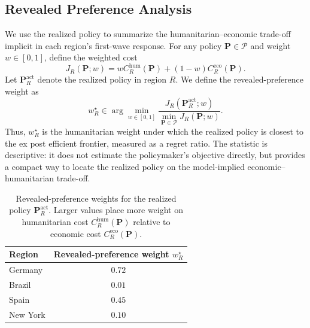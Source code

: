 \documentclass[msom,blindrev]{informs3} %
\newcommand{\rev}[1]{{\color{blue}#1}}
\begin{document}
\begin{APPENDICES}
\section{\rev{Revealed Preference Analysis}}
\label{app:revealed_preference}

{\color{blue}

We use the realized policy to summarize the humanitarian--economic trade-off implicit in each region's first-wave response. For any policy $\bm{P}\in\mathcal{P}$ and weight $w\in[0,1]$, define the weighted cost
\[
J_R(\bm{P};w)
=
w C_R^{\mathrm{hum}}(\bm{P})
+(1-w)C_R^{\mathrm{eco}}(\bm{P}).
\]
Let $\bm{P}_R^{\mathrm{act}}$ denote the realized policy in region $R$. We define the revealed-preference weight as
\[
w_R^\star
\in
\arg\min_{w\in[0,1]}
\frac{J_R(\bm{P}_R^{\mathrm{act}};w)}
{\min_{\bm{P}\in\mathcal{P}} J_R(\bm{P};w)}.
\]
Thus, $w_R^\star$ is the humanitarian weight under which the realized policy is closest to the ex post efficient frontier, measured as a regret ratio. The statistic is descriptive: it does not estimate the policymaker's objective directly, but provides a compact way to locate the realized policy on the model-implied economic--humanitarian trade-off.}

\begin{table}[htbp!]
\centering
\small
\begin{tabular}{|l|c|}
\hline
\textbf{Region} & \textbf{Revealed-preference weight $w_R^\star$} \\\hline
Germany  & $0.72$ \\
Brazil   & $0.01$ \\
Spain    & $0.45$ \\
New York & $0.10$ \\\hline
\end{tabular}
\caption{\rev{Revealed-preference weights for the realized policy $\bm{P}_R^{\mathrm{act}}$. Larger values place more weight on humanitarian cost $C_R^{\mathrm{hum}}(\bm{P})$ relative to economic cost $C_R^{\mathrm{eco}}(\bm{P})$.}}
\label{tab:revealed_preference_weights}
\end{table}



\end{APPENDICES}
\end{document}
